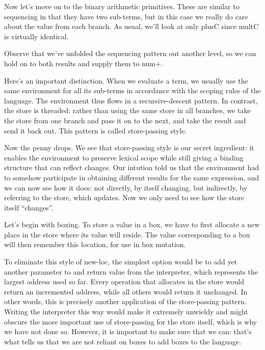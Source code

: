 Now let’s move on to the binary arithmetic primitives. These are similar to
sequencing in that they have two sub-terms, but in this case we really do care
about the value from each branch. As usual, we’ll look at only plusC since multC
is virtually identical.

Observe that we’ve unfolded the sequencing pattern out another level, so we can
hold on to both results and supply them to num+.

Here’s an important distinction. When we evaluate a term, we usually use the
same environment for all its sub-terms in accordance with the scoping rules of
the language. The environment thus flows in a recursive-descent pattern. In
contrast, the store is threaded: rather than using the same store in all
branches, we take the store from one branch and pass it on to the next, and take
the result and send it back out. This pattern is called store-passing style.

Now the penny drops. We see that store-passing style is our secret ingredient:
it enables the environment to preserve lexical scope while still giving a
binding structure that can reflect changes. Our intution told us that the
environment had to somehow participate in obtaining different results for the
same expression, and we can now see how it does: not directly, by itself
changing, but indirectly, by referring to the store, which updates. Now we only
need to see how the store itself “changes”.

Let’s begin with boxing. To store a value in a box, we have to first allocate a
new place in the store where its value will reside. The value corresponding to a
box will then remember this location, for use in box mutation.


To eliminate this style of new-loc, the simplest option would be to add yet
another parameter to and return value from the interpreter, which represents the
largest address used so far. Every operation that allocates in the store would
return an incremented address, while all others would return it unchanged. In
other words, this is precisely another application of the store-passing pattern.
Writing the interpreter this way would make it extremely unwieldy and might
obscure the more important use of store-passing for the store itself, which is
why we have not done so. However, it is important to make sure that we can:
that’s what tells us that we are not reliant on boxes to add boxes to the
language.


